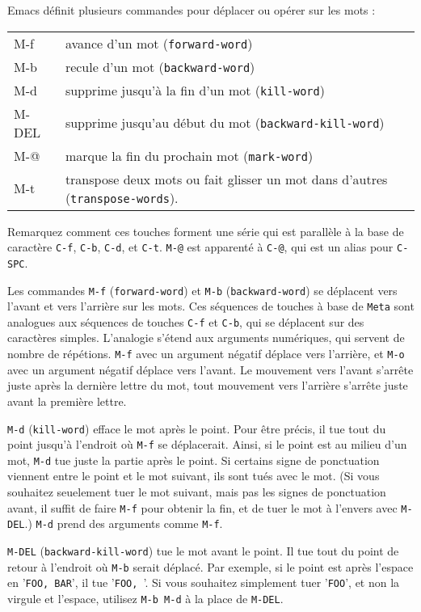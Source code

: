 Emacs définit plusieurs commandes pour déplacer ou opérer sur les mots
:
\begin{center}
  \begin{tabular}[m]{>{\ttfamily}ll}
    M-f & avance d'un mot (\texttt{forward-word}) \\
    M-b & recule d'un mot (\texttt{backward-word}) \\
    M-d & supprime jusqu'à la fin d'un mot (\texttt{kill-word}) \\
    M-DEL & supprime jusqu'au début du mot (\texttt{backward-kill-word}) \\
    M-@ & marque la fin du prochain mot (\texttt{mark-word}) \\
    M-t & transpose deux mots ou fait glisser un mot dans d'autres
    (\texttt{transpose-words}). 
  \end{tabular}
\end{center}

Remarquez comment ces touches forment une série qui est parallèle à la
base de caractère \texttt{C-f}, \texttt{C-b}, \texttt{C-d}, \DEL et
\texttt{C-t}. \texttt{M-@} est apparenté à \texttt{C-@}, qui est un
alias pour \texttt{C-SPC}.

Les commandes \texttt{M-f} (\texttt{forward-word}) et \texttt{M-b}
(\texttt{backward-word}) se déplacent vers l'avant et vers l'arrière
sur les mots. Ces séquences de touches à base de \texttt{Meta} sont
analogues aux séquences de touches \texttt{C-f} et \texttt{C-b}, qui
se déplacent sur des caractères simples. L'analogie s'étend aux
arguments numériques, qui servent de nombre de répétions. \texttt{M-f}
avec un argument négatif déplace vers l'arrière, et \texttt{M-o} avec
un argument négatif déplace vers l'avant. Le mouvement vers l'avant
s'arrête juste après la dernière lettre du mot, tout mouvement vers
l'arrière s'arrête juste avant la première lettre. 

\texttt{M-d} (\texttt{kill-word}) efface le mot après le point. Pour
être précis, il tue tout du point jusqu'à l'endroit où \texttt{M-f} se
déplacerait. Ainsi, si le point est au milieu d'un mot, \texttt{M-d}
tue juste la partie après le point. Si certains signe de ponctuation
viennent entre le point et le mot suivant, ils sont tués avec le
mot. (Si vous souhaitez seuelement tuer le mot suivant, mais pas les
signes de ponctuation avant, il suffit de faire \texttt{M-f} pour
obtenir la fin, et de tuer le mot à l'envers avec \texttt{M-DEL}.)
\texttt{M-d} prend des arguments comme \texttt{M-f}. 

\texttt{M-DEL} (\texttt{backward-kill-word}) tue le mot avant le
point. Il tue tout du point de retour à l'endroit où \texttt{M-b}
serait déplacé. Par exemple, si le point est après l'espace en
'\texttt{FOO, BAR}', il tue '\texttt{FOO, }'. Si vous souhaitez
simplement tuer '\texttt{FOO}', et non la virgule et l'espace,
utilisez \texttt{M-b M-d} à la place de \texttt{M-DEL}.

